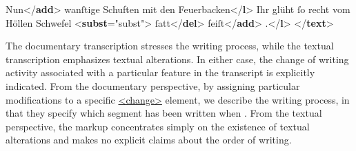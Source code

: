 \begin{shaded}
\hspace*{1em}\hspace*{1em}\hspace*{1em}Nun{</\textbf{add}>}\mbox{}\newline 
\hspace*{1em}\hspace*{1em} wanſtige Schuften mit den Feuerbacken{</\textbf{l}>}\mbox{}\newline 
\hspace*{1em}Ihr glüht ſo recht vom Höllen Schwefel {<\textbf{subst}\hspace*{1em}{xml:id}="{subst}">}\mbox{}\newline 
\hspace*{1em}\hspace*{1em}\hspace*{1em}ſatt{</\textbf{del}>}\mbox{}\newline 
\hspace*{1em}\hspace*{1em}\hspace*{1em}feiſt{</\textbf{add}>}\mbox{}\newline 
\hspace*{1em}\hspace*{1em}.{</\textbf{l}>}\mbox{}\newline 
{}\mbox{}\newline 
{</\textbf{text}>}\end{shaded}\egroup\par \par
The documentary transcription stresses the writing process, while the textual transcription emphasizes textual alterations. In either case, the change of writing activity associated with a particular feature in the transcript is explicitly indicated. From the documentary perspective, by assigning particular modifications to a specific \hyperref[TEI.change]{<change>} element, we describe the writing process, in that they specify which segment has been written when . From the textual perspective, the markup concentrates simply on the existence of textual alterations and makes no explicit claims about the order of writing. 
